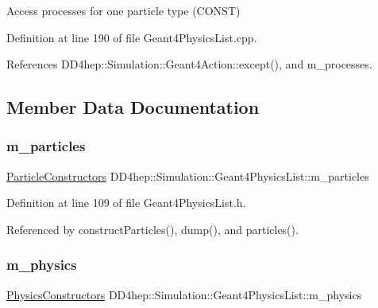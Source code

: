 Access processes for one particle type (C\+O\+N\+ST) 



Definition at line 190 of file Geant4\+Physics\+List.\+cpp.



References D\+D4hep\+::\+Simulation\+::\+Geant4\+Action\+::except(), and m\+\_\+processes.



\subsection{Member Data Documentation}
\hypertarget{class_d_d4hep_1_1_simulation_1_1_geant4_physics_list_afb427bf428aa0c62f79717a598f60de7}{}\label{class_d_d4hep_1_1_simulation_1_1_geant4_physics_list_afb427bf428aa0c62f79717a598f60de7} 
\subsubsection{\texorpdfstring{m\+\_\+particles}{m\_particles}}
{\footnotesize\ttfamily \hyperlink{class_d_d4hep_1_1_simulation_1_1_geant4_physics_list_afaee3763aea79b299830be37f9642342}{Particle\+Constructors} D\+D4hep\+::\+Simulation\+::\+Geant4\+Physics\+List\+::m\+\_\+particles}



Definition at line 109 of file Geant4\+Physics\+List.\+h.



Referenced by construct\+Particles(), dump(), and particles().

\hypertarget{class_d_d4hep_1_1_simulation_1_1_geant4_physics_list_a7b5de6ccab6cd1083de316546cdba96e}{}\label{class_d_d4hep_1_1_simulation_1_1_geant4_physics_list_a7b5de6ccab6cd1083de316546cdba96e} 
\subsubsection{\texorpdfstring{m\+\_\+physics}{m\_physics}}
{\footnotesize\ttfamily \hyperlink{class_d_d4hep_1_1_simulation_1_1_geant4_physics_list_a5953826b626c21fa4b26ab9a07f3b8ad}{Physics\+Constructors} D\+D4hep\+::\+Simulation\+::\+Geant4\+Physics\+List\+::m\+\_\+physics}



